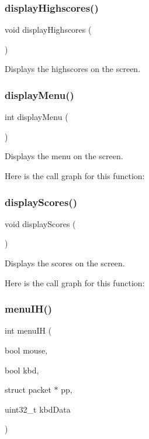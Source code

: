 \subsubsection{\texorpdfstring{displayHighscores()}{displayHighscores()}}
{\footnotesize\ttfamily void display\+Highscores (\begin{DoxyParamCaption}{ }\end{DoxyParamCaption})}



Displays the highscores on the screen. 

\mbox{\label{group__menu_gaad9ed7a055a99883645739e4bfca0e5e}} 
\subsubsection{\texorpdfstring{displayMenu()}{displayMenu()}}
{\footnotesize\ttfamily int display\+Menu (\begin{DoxyParamCaption}{ }\end{DoxyParamCaption})}



Displays the menu on the screen. 

Here is the call graph for this function\+:
\mbox{\label{group__menu_ga4e67dd36352ce9409d1994cad2553089}} 
\subsubsection{\texorpdfstring{displayScores()}{displayScores()}}
{\footnotesize\ttfamily void display\+Scores (\begin{DoxyParamCaption}{ }\end{DoxyParamCaption})}



Displays the scores on the screen. 

Here is the call graph for this function\+:
\mbox{\label{group__menu_ga1c459dc7e822e8e658b11c66508d79f1}} 
\subsubsection{\texorpdfstring{menuIH()}{menuIH()}}
{\footnotesize\ttfamily int menu\+IH (\begin{DoxyParamCaption}\item[{bool}]{mouse,  }\item[{bool}]{kbd,  }\item[{struct packet $\ast$}]{pp,  }\item[{uint32\+\_\+t}]{kbd\+Data }\end{DoxyParamCaption})}



